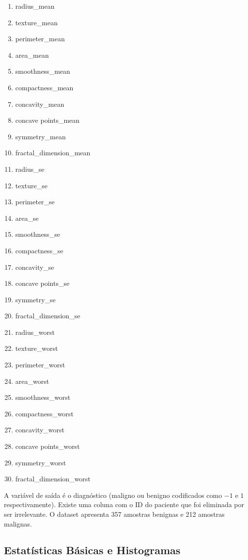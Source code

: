 \documentclass[11pt,a4paper]{article}
\numberwithin{equation}{section}
\begin{document}
\begin{multicols}{3}
\begin{enumerate}
    \item radius\_mean	
    \item texture\_mean
    \item perimeter\_mean
    \item area\_mean
    \item smoothness\_mean
    \item compactness\_mean
    \item concavity\_mean
    \item concave points\_mean
    \item symmetry\_mean
    \item fractal\_dimension\_mean
    \item radius\_se
    \item texture\_se
    \item perimeter\_se
    \item area\_se
    \item smoothness\_se
    \item compactness\_se
    \item concavity\_se
    \item concave points\_se
    \item symmetry\_se
    \item fractal\_dimension\_se
    \item radius\_worst
    \item texture\_worst
    \item perimeter\_worst
    \item area\_worst
    \item smoothness\_worst
    \item compactness\_worst
    \item concavity\_worst
    \item concave points\_worst
    \item symmetry\_worst
    \item fractal\_dimension\_worst
\end{enumerate}
\end{multicols}

A variável de saída é o diagnóstico (maligno ou benigno codificados como $-1$ e $1$ respectivamente). Existe uma coluna com o ID do paciente que foi eliminada por ser irrelevante. O dataset apresenta 357 amostras benignas e 212 amostras malignas. 

\subsection{Estatísticas Básicas e Histogramas}
\end{document}
